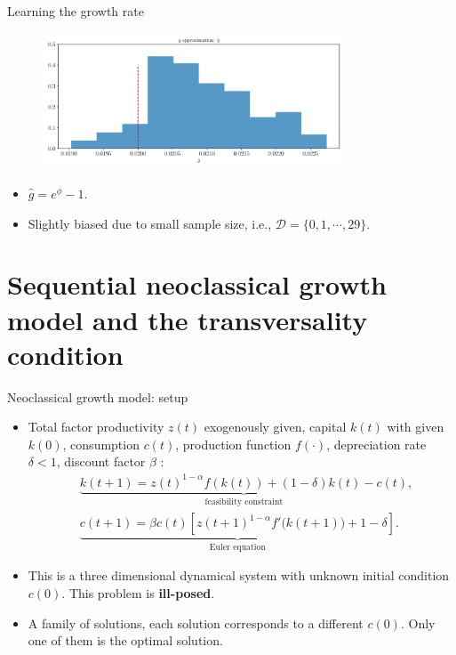 \documentclass[aspectratio=169,10pt]{beamer}
\newcommand{\emphcolor}[1]{\textbf{\textcolor{emphcolorval}{#1}}}
\begin{document}
\begin{frame}[label= growing-dividends]{Learning the growth rate}
	
	\begin{figure}[htb]
		\centering
		\includegraphics[width=9cm]{figs/asset_pricing_sequential_g_histogram.pdf}
	\end{figure}
	
	\begin{itemize}
		\item $\hat{g} = e^\phi -1$.
		\item Slightly biased due to small sample size, i.e., $\mathcal{D} = \{0,1,\cdots,29\}$.
	\end{itemize}

\end{frame}


\section{\textcolor{PennBlue}{Sequential neoclassical growth model and the transversality condition }}


\begin{frame}{Neoclassical growth model: setup }
	\begin{itemize}
		\item Total factor productivity $z(t)$ exogenously given, capital $k(t)$ with given $k(0)$, consumption $c(t)$, production function $f(\cdot)$, depreciation rate $\delta<1$, discount factor $\beta$  :
		\begin{align*}
			&\underbrace{k(t+1) = z(t)^{1-\alpha} f\left(k(t)\right)+ (1-\delta)k(t)-c(t)}_{\text{feasibility constraint}}, \\ 
			&\underbrace{c(t+1) = \beta c(t) \left[z(t+1)^{1-\alpha}f'\big(k(t+1)\big)+1-\delta\right]}_{\text{Euler equation}}.
		\end{align*}
	\item This is a three dimensional dynamical system with unknown initial condition  $c(0)$. This problem is \emphcolor{ill-posed}.
	\vspace{0.05in}
	\item A family of solutions, each solution corresponds to a different $c(0)$. Only one of them is the optimal solution.
	\end{itemize}	
\end{frame}
\end{document}

